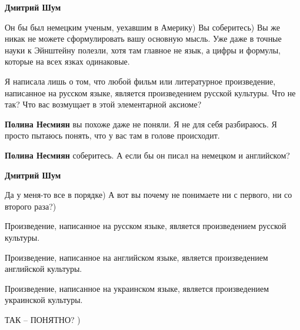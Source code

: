 \begin{itemize}
\begin{itemize}
\textbf{Дмитрий Шум} 

Он бы был немецким ученым, уехавшим в Америку) Вы соберитесь) Вы же никак не
можете сформулировать вашу основную мысль. Уже даже в точные науки к Эйнштейну
полезли, хотя там главное не язык, а цифры и формулы, которые на всех язках
одинаковые.

Я написала лишь о том, что любой фильм или литературное произведение,
написанное на русском языке, является произведением русской культуры. Что не
так? Что вас возмущает в этой элементарной аксиоме?


 
\textbf{Полина Несмиян} вы похоже даже не поняли. Я не для себя разбираюсь. Я
просто пытаюсь понять, что у вас там в голове происходит.

 
\textbf{Полина Несмиян} соберитесь. А если бы он писал на немецком и английском?

 
\textbf{Дмитрий Шум} 

Да у меня-то все в порядке) А вот вы почему не понимаете ни с первого, ни со
второго раза?)

Произведение, написанное на русском языке, является произведением русской
культуры.

Произведение, написанное на английском языке, является произведением английской
культуры.

Произведение, написанное на украинском языке, является произведением украинской
культуры.

ТАК – ПОНЯТНО? )

 

\end{itemize}
\end{itemize}
